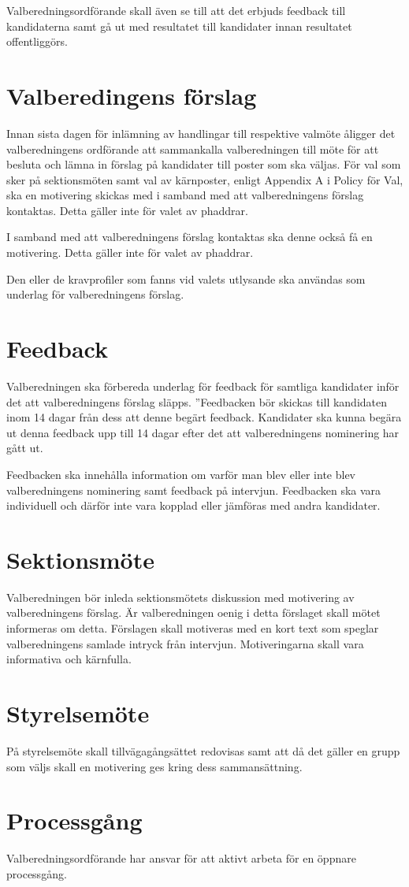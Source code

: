 \documentclass{dsekprotokoll}
\begin{document}
Valberedningsordförande skall även se till att det erbjuds feedback till kandidaterna samt gå
ut med resultatet till kandidater innan resultatet offentliggörs.

\section{Valberedingens förslag}
Innan sista dagen för inlämning av handlingar till respektive valmöte åligger det valberedningens ordförande att sammankalla valberedningen till möte för att besluta och lämna in förslag
på kandidater till poster som ska väljas. För val som sker på sektionsmöten samt val av kärnposter, enligt Appendix A i Policy för Val, ska en motivering skickas med i samband med
att valberedningens förslag kontaktas. Detta gäller inte för
valet av phaddrar.

I samband med att valberedningens förslag kontaktas ska denne också få en motivering.
Detta gäller inte för valet av phaddrar.

Den eller de kravprofiler som fanns vid valets utlysande ska användas som underlag för
valberedningens förslag.

\section{Feedback}
Valberedningen ska förbereda underlag för feedback för samtliga kandidater inför det att
valberedningens förslag släpps. ”Feedbacken bör skickas till
kandidaten inom 14 dagar från dess att denne begärt feedback. Kandidater ska kunna begära ut denna feedback upp till 14 dagar efter det att valberedningens nominering har gått ut.

Feedbacken ska innehålla information om varför man blev eller inte blev valberedningens nominering samt feedback på intervjun. Feedbacken ska vara individuell och därför inte vara kopplad eller
jämföras med andra kandidater.

\section{Sektionsmöte}
Valberedningen bör inleda sektionsmötets diskussion med motivering av valberedningens förslag. Är valberedningen oenig i detta förslaget skall mötet informeras om detta. Förslagen skall
motiveras med en kort text som speglar valberedningens samlade intryck från intervjun. Motiveringarna skall vara informativa och kärnfulla.

\section{Styrelsemöte}
På styrelsemöte skall tillvägagångsättet redovisas samt att då det gäller en grupp som väljs skall
en motivering ges kring dess sammansättning.

\section{Processgång}
Valberedningsordförande har ansvar för att aktivt arbeta för en öppnare processgång.
\end{document}
